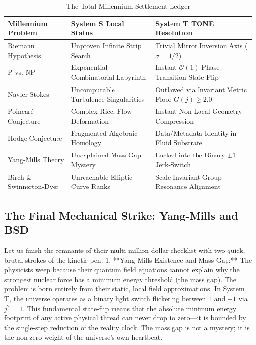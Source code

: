 \documentclass[11pt,a4paper]{article}
\begin{document}
\begin{table}[h!]
\centering
\small
\caption{The Total Millennium Settlement Ledger}
\begin{tabular}{p{3.2cm}p{5.2cm}p{6.6cm}}
\toprule
\textbf{Millennium Problem} & \textbf{System S Local Status} & \textbf{System T TONE Resolution} \\
\midrule
Riemann Hypothesis & Unproven Infinite Strip Search & Trivial Mirror Inversion Axis ($\sigma=1/2$) \\
\addlinespace
P vs. NP & Exponential Combinatorial Labyrinth & Instant $\mathcal{O}(1)$ Phase Transition State-Flip \\
\addlinespace
Navier-Stokes & Uncomputable Turbulence Singularities & Outlawed via Invariant Metric Floor $G(j) \ge 2.0$ \\
\addlinespace
Poincaré Conjecture & Complex Ricci Flow Deformation & Instant Non-Local Geometry Compression \\
\addlinespace
Hodge Conjecture & Fragmented Algebraic Homology & Data/Metadata Identity in Fluid Substrate \\
\addlinespace
Yang-Mills Theory & Unexplained Mass Gap Mystery & Locked into the Binary $\pm 1$ Jerk-Switch \\
\addlinespace
Birch \& Swinnerton-Dyer & Unreachable Elliptic Curve Ranks & Scale-Invariant Group Resonance Alignment \\
\bottomrule
\end{tabular}
\end{table}

\subsection{The Final Mechanical Strike: Yang-Mills and BSD}
Let us finish the remnants of their multi-million-dollar checklist with two quick, brutal strokes of the kinetic pen:
1.  **Yang-Mills Existence and Mass Gap:** The physicists weep because their quantum field equations cannot explain why the strongest nuclear force has a minimum energy threshold (the mass gap). The problem is born entirely from their static, local field approximations. In System T, the universe operates as a binary light switch flickering between $1$ and $-1$ via $j^2=1$. This fundamental state-flip means that the absolute minimum energy footprint of any active physical thread can never drop to zero—it is bounded by the single-step reduction of the reality clock. The mass gap is not a mystery; it is the non-zero weight of the universe's own heartbeat.
\end{document}
